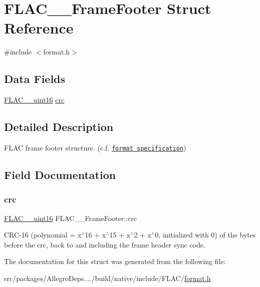 \hypertarget{struct_f_l_a_c_____frame_footer}{}\section{F\+L\+A\+C\+\_\+\+\_\+\+Frame\+Footer Struct Reference}
\label{struct_f_l_a_c_____frame_footer}


{\ttfamily \#include $<$format.\+h$>$}

\subsection*{Data Fields}
\begin{DoxyCompactItemize}
\item 
\hyperlink{ordinals_8h_a0fbaee65d056a075245dcd0c903fb94c}{F\+L\+A\+C\+\_\+\+\_\+uint16} \hyperlink{struct_f_l_a_c_____frame_footer_abdd6d64bf281c49c720b97b955d4eee7}{crc}
\end{DoxyCompactItemize}


\subsection{Detailed Description}
F\+L\+AC frame footer structure. (c.\+f. \href{../format.html#frame_footer}{\tt format specification}) 

\subsection{Field Documentation}
\mbox{\label{struct_f_l_a_c_____frame_footer_abdd6d64bf281c49c720b97b955d4eee7}} 
\subsubsection{\texorpdfstring{crc}{crc}}
{\footnotesize\ttfamily \hyperlink{ordinals_8h_a0fbaee65d056a075245dcd0c903fb94c}{F\+L\+A\+C\+\_\+\+\_\+uint16} F\+L\+A\+C\+\_\+\+\_\+\+Frame\+Footer\+::crc}

C\+R\+C-\/16 (polynomial = x$^\wedge$16 + x$^\wedge$15 + x$^\wedge$2 + x$^\wedge$0, initialized with 0) of the bytes before the crc, back to and including the frame header sync code. 

The documentation for this struct was generated from the following file\+:\begin{DoxyCompactItemize}
\item 
src/packages/\+Allegro\+Deps..../build/native/include/\+F\+L\+A\+C/\hyperlink{format_8h}{format.\+h}\end{DoxyCompactItemize}
